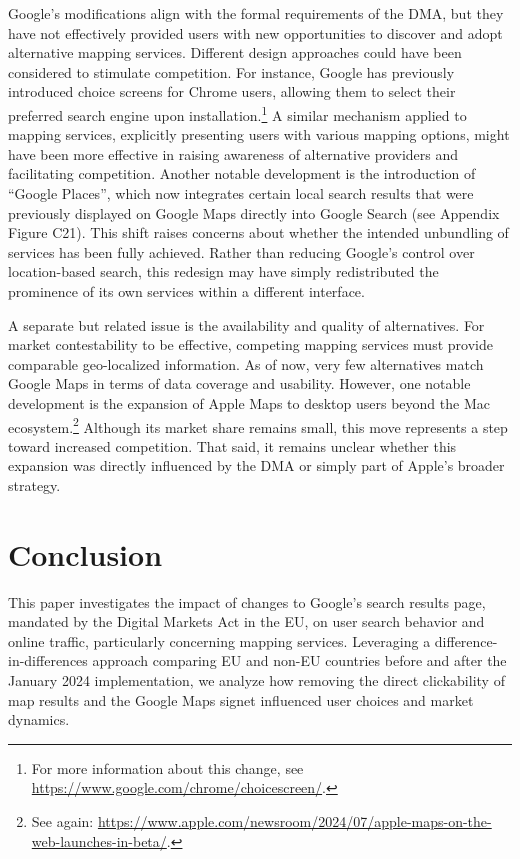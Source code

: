 \documentclass[11pt]{article}
\begin{document}
	Google’s modifications align with the formal requirements of the DMA, but they have not effectively provided users with new opportunities to discover and adopt alternative mapping services. Different design approaches could have been considered to stimulate competition. For instance, Google has previously introduced choice screens for Chrome users, allowing them to select their preferred search engine upon installation.\footnote{For more information about this change, see \href{https://www.google.com/chrome/choicescreen/}{https://www.google.com/chrome/choicescreen/}.} A similar mechanism applied to mapping services, explicitly presenting users with various mapping options, might have been more effective in raising awareness of alternative providers and facilitating competition. Another notable development is the introduction of ``Google Places'', which now integrates certain local search results that were previously displayed on Google Maps directly into Google Search (see Appendix Figure C21). This shift raises concerns about whether the intended unbundling of services has been fully achieved. Rather than reducing Google’s control over location-based search, this redesign may have simply redistributed the prominence of its own services within a different interface. 
	
	A separate but related issue is the availability and quality of alternatives. For market contestability to be effective, competing mapping services must provide comparable geo-localized information. As of now, very few alternatives match Google Maps in terms of data coverage and usability. However, one notable development is the expansion of Apple Maps to desktop users beyond the Mac ecosystem.\footnote{See again: \href{https://www.apple.com/newsroom/2024/07/apple-maps-on-the-web-launches-in-beta/}{https://www.apple.com/newsroom/2024/07/apple-maps-on-the-web-launches-in-beta/}.} Although its market share remains small, this move represents a step toward increased competition. That said, it remains unclear whether this expansion was directly influenced by the DMA or simply part of Apple’s broader strategy.
	
	\section{Conclusion}\label{sec:conclusion}
	This paper investigates the impact of changes to Google's search results page, mandated by the Digital Markets Act in the EU, on user search behavior and online traffic, particularly concerning mapping services. Leveraging a difference-in-differences approach comparing EU and non-EU countries before and after the January 2024 implementation, we analyze how removing the direct clickability of map results and the Google Maps signet influenced user choices and market dynamics.
	
\end{document}
